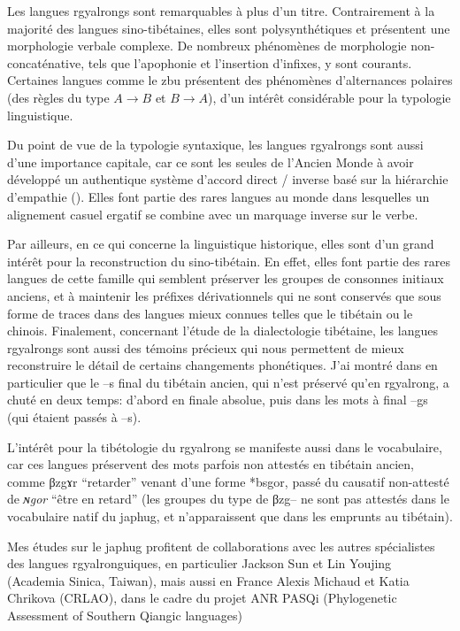 \documentclass[oldfontcommands,oneside,a4paper,11pt]{memoir}
\newcommand{\ipa}[1]{{\phon #1}} %
\begin{document}
Les langues rgyalrongs sont remarquables à plus d’un titre. Contrairement à la majorité des langues sino-tibétaines, elles sont polysynthétiques et présentent une morphologie verbale complexe. De nombreux phénomènes de morphologie non-concaténative, tels que l’apophonie et l’insertion d’infixes, y sont courants. Certaines langues comme le zbu présentent des phénomènes d'alternances polaires (des règles du type $A \rightarrow B$ et $B \rightarrow A$), d'un intérêt considérable pour la typologie linguistique.


Du point de vue de la typologie syntaxique, les langues rgyalrongs sont aussi d’une importance capitale, car ce sont les seules de l’Ancien Monde à avoir développé un authentique système d’accord direct / inverse basé sur la hiérarchie d’empathie (\citealt{jacques10inverse}). Elles font partie des rares langues au monde dans lesquelles un alignement casuel ergatif se combine avec un marquage inverse sur le verbe.


Par ailleurs, en ce qui concerne la linguistique historique, elles sont d’un grand intérêt pour la reconstruction du sino-tibétain. En effet, elles font partie des rares langues de cette famille qui semblent préserver les groupes de consonnes initiaux anciens, et à maintenir les préfixes dérivationnels qui ne sont conservés que sous forme de traces dans des langues mieux connues telles que le tibétain ou le chinois. Finalement, concernant l’étude de la dialectologie tibétaine, les langues rgyalrongs sont aussi des témoins précieux qui nous permettent de mieux reconstruire le détail de certains changements phonétiques. J'ai montré dans \citet{jacques06s} en particulier que le --s final du tibétain ancien, qui n'est préservé qu'en rgyalrong, a chuté en deux temps: d'abord en finale absolue, puis dans les mots à final --gs (qui étaient passés à --s).

L'intérêt pour la tibétologie du rgyalrong se manifeste aussi dans le vocabulaire, car ces langues préservent des mots parfois non attestés en tibétain ancien, comme \ipa{βzgɤr} ``retarder'' venant d'une forme *bsgor, passé du causatif non-attesté de \textit{ɴgor} ``être en retard'' (les groupes du type de \ipa{βzg--} ne sont pas attestés dans le vocabulaire natif du japhug, et n'apparaissent que dans les emprunts au tibétain).

Mes études sur le japhug profitent de collaborations avec les autres spécialistes des langues rgyalronguiques, en particulier Jackson Sun et Lin Youjing (Academia Sinica, Taiwan), mais  aussi en France Alexis Michaud et Katia Chrikova (CRLAO), dans le cadre du projet ANR PASQi (Phylogenetic Assessment of Southern Qiangic languages) 
\end{document}
